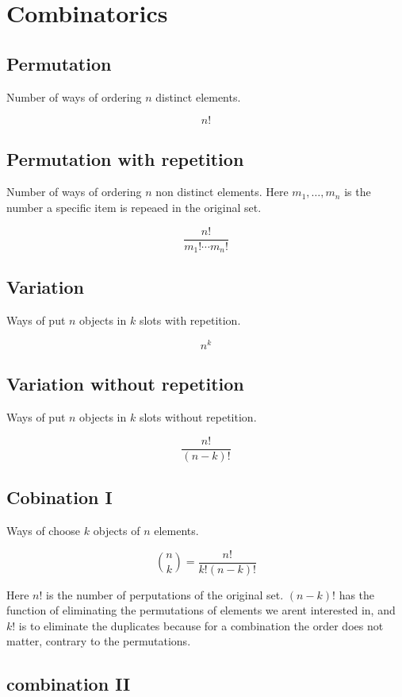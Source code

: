 \section{Combinatorics}

\subsection{Permutation}

Number of ways of ordering \(n\) distinct elements.

\[n!\]

\subsection{Permutation with repetition}

Number of ways of ordering \(n\) non distinct elements. Here \(m_1, \dots, m_n\)
is the number a specific item is repeaed in the original set.

\[\frac{n!}{m_1! \cdots m_n!}\]

\subsection{Variation}

Ways of put \(n\) objects in \(k\) slots with repetition.

\[n^k\]

\subsection{Variation without repetition}

Ways of put \(n\) objects in \(k\) slots without repetition.

\[\frac{n!}{(n -k)!}\]

\subsection{Cobination I}

Ways of choose \(k\) objects of \(n\) elements.

\[\binom{n}{k} = \frac{n!}{k!(n-k)!}\]

Here \(n!\) is the number of perputations of the original set.
\((n-k)!\) has the function of eliminating the permutations of elements we arent interested in, and
\(k!\) is to eliminate the duplicates because for a combination the order does not matter, contrary to
the permutations.

\subsection{combination II}

